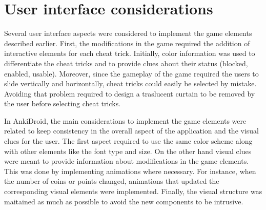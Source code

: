 \section{User interface considerations}
Several user interface aspects were considered to implement the game elements described earlier. First, the modifications in the game required the addition of interactive elements for each cheat trick. Initially, color information was used to differentiate the cheat tricks and to provide clues about their status (blocked, enabled, usable). Moreover, since the gameplay of the game required the users to slide vertically and horizontally, cheat tricks could easily be selected by mistake. Avoiding that problem required to design a traslucent curtain to be removed by the user before selecting cheat tricks.

In AnkiDroid, the main considerations to implement the game elements were related to keep consistency in the overall aspect of the application and the visual clues for the user. The first aspect required to use the same color scheme along with other elements like the font type and size. On the other hand visual clues were meant to provide information about modifications in the game elements. This was done by implementing animations where necessary. For instance, when the number of coins or points changed, animations that updated the corresponding visual elements were implemented. Finally, the visual structure was maitained as much as possible to avoid the new components to be intrusive.

